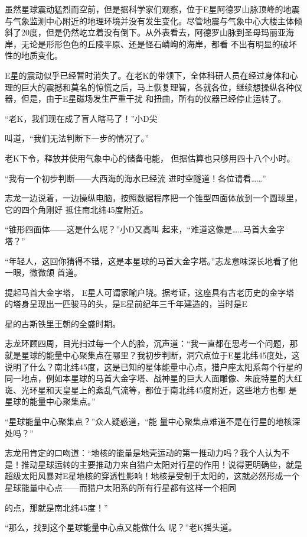 \documentclass{article}
\begin{document}
虽然星球震动猛烈而空前，但是据科学家们观察，位于E星阿德罗山脉顶峰的地震与气象监测中心附近的地理环境并没有发生变化。尽管地震与气象中心大楼主体倾斜了20度，但是仍然屹立着没有倒下。从外表看去，阿德罗山脉到圣母玛丽亚海岸，无论是形形色色的丘陵平原、还是怪石嶙峋的海岸，都看
不出有明显的破坏性的地质变化。 

E星的震动似乎已经暂时消失了。在老K的带领下，全体科研人员在经过身体和心理的巨大的震撼和莫名的惊慌之后，马上恢复理智，各就各位，继续想操纵各种仪器，但是，由于E星磁场发生严重干扰
和扭曲，所有的仪器已经停止运转了。 

“老K，我们现在成了盲人瞎马了！”小D尖

\newpage
叫道，“我们无法判断下一步的情况了。” 

老K下令，释放并使用气象中心的储备电能，
但据估算也只够用四十八个小时。 

“我有一个初步判断——大西海的海水已经流
进时空隧道！各位请看……” 

志龙一边说着，一边操纵电脑，按照数据程序把一个锥型四面体放到一个圆球里，它的四个角刚好
抵住南北纬45度附近。 

“锥形四面体——这是什么呢？”小D又高叫
起来，“难道这像是……马首大金字塔？” 

“年轻人，这回你猜得不错，这是本星球的马首大金字塔。”志龙意味深长地看了他一眼，微微颌
首道。 

提起马首大金字塔， E星人可谓家喻户晓。据考证，这座具有古老历史的金字塔的塔身呈现出一匹骏马的头，是E星前纪年三千年建造的，当时是E
\newpage

星的古斯铁里王朝的全盛时期。 

志龙环顾四周，目光扫过每一个人的脸，沉声道：“我一直都在思考一个问题，那就是星球的能量中心聚集点在哪里？我初步判断，洞穴点位于E星北纬45度处，这说明了什么？南北纬45度，这是已知的星体能量中心点，猎户座太阳系每个行星的同一地点，例如本星球的马首大金字塔、战神星的巨大人面雕像、朱庇特星的大红斑、光环星和天皇星上的紊乱气流等，都位于南北纬45度附近，这些地方也都
是星球的能量中心聚集点。” 

“星球能量中心聚集点？”众人疑惑道，“能
量中心聚集点难道不是在行星的地核深处吗？” 

志龙用肯定的口吻道：“地核的能量是地壳运动的第一推动力吗？我个人认为不是！推动星球运转的主要推动力来自猎户太阳对行星的作用！说得更明确些，就是超级太阳风暴对E星地核的穿透性影响！地核是受制于太阳的，这就必然形成一个星球能量中心点——而猎户太阳系的所有行星都有这样一个相同
\newpage

的点，那就是南北纬45度！” 

“那么，找到这个星球能量中心点又能做什么
呢？”老K摇头道。 
\end{document}
